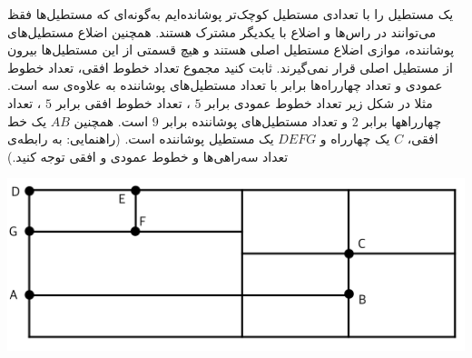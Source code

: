 \EXERCISE
یک مستطیل را با تعدادی مستطیل کوچک‌تر پوشانده‌ایم به‌گونه‌ای که مستطیل‌ها فقظ می‌توانند در راس‌ها و اضلاع با یکدیگر مشترک هستند. همچنین اضلاع مستطیل‌های پوشاننده، موازی اضلاع مستطیل اصلی هستند و هیچ قسمتی از این مستطیل‌ها بیرون از مستطیل اصلی قرار نمی‌گیرند. ثابت کنید مجموع تعداد خطوط افقی، تعداد خطوط عمودی و تعداد چهارراه‌ها برابر با تعداد مستطیل‌های پوشاننده به علاوه‌ی سه است. مثلا در شکل زیر تعداد خطوط عمودی برابر
$5$
، تعداد خطوط افقی برابر
$5$
، تعداد چهارراهها برابر
$2$
و تعداد مستطیل‌های پوشاننده برابر
$9$
است. همچنین
$AB$
یک خط افقی،
$C$
یک چهارراه و
$DEFG$
یک مستطیل پوشاننده است. (راهنمایی: به رابطه‌ی تعداد سه‌راهی‌ها و خطوط عمودی و افقی توجه کنید.)
    \begin{center}
     	\includegraphics[scale=0.2]{./11.png}
    \end{center}